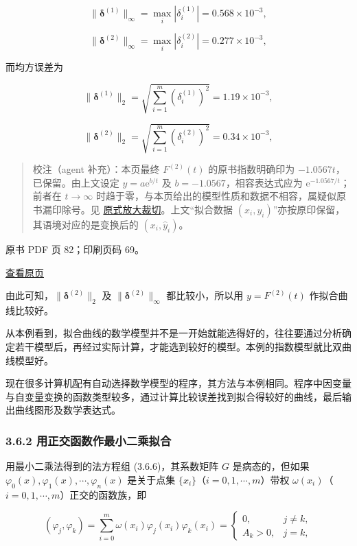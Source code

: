 \[
\|\boldsymbol\delta^{(1)}\|_\infty=\max_i|\delta_i^{(1)}|=0.568\times10^{-3},
\]

\[
\|\boldsymbol\delta^{(2)}\|_\infty=\max_i|\delta_i^{(2)}|=0.277\times10^{-3},
\]

而均方误差为

\[
\|\boldsymbol\delta^{(1)}\|_2=\sqrt{\sum_{i=1}^m(\delta_i^{(1)})^2}=1.19\times10^{-3},
\]

\[
\|\boldsymbol\delta^{(2)}\|_2=\sqrt{\sum_{i=1}^m(\delta_i^{(2)})^2}=0.34\times10^{-3},
\]

\begin{quote}
校注（agent 补充）：本页最终 \(F^{(2)}(t)\) 的原书指数明确印为 \(-1.0567t\)，已保留。由上文设定 \(y=a\mathrm e^{b/t}\) 及 \(b=-1.0567\)，相容表达式应为 \(\mathrm e^{-1.0567/t}\)；前者在 \(t\to\infty\) 时趋于零，与本页给出的模型性质和数据不相容，属疑似原书漏印除号。见 \href{verified/assets/ch03b/p081-exponential-fit.png}{原式放大裁切}。上文``拟合数据 \((x_i,y_i)\)''亦按原印保留，其语境对应的是变换后的 \((x_i,\hat y_i)\)。
\end{quote}

\clearpage

原书 PDF 页 82；印刷页码 69。

\href{source-images/pdf-082.jpeg}{查看原页}

由此可知，\(\|\boldsymbol\delta^{(2)}\|_2\) 及 \(\|\boldsymbol\delta^{(2)}\|_\infty\) 都比较小，所以用 \(y=F^{(2)}(t)\) 作拟合曲线比较好。

从本例看到，拟合曲线的数学模型并不是一开始就能选得好的，往往要通过分析确定若干模型后，再经过实际计算，才能选到较好的模型。本例的指数模型就比双曲线模型好。

现在很多计算机配有自动选择数学模型的程序，其方法与本例相同。程序中因变量与自变量变换的函数类型较多，通过计算比较误差找到拟合得较好的曲线，最后输出曲线图形及数学表达式。

\subsubsection{3.6.2 用正交函数作最小二乘拟合}\label{ch03b-ux7528ux6b63ux4ea4ux51fdux6570ux4f5cux6700ux5c0fux4e8cux4e58ux62dfux5408}

用最小二乘法得到的法方程组 (3.6.6)，其系数矩阵 \(G\) 是病态的，但如果 \(\varphi_0(x),\varphi_1(x),\cdots,\varphi_n(x)\) 是关于点集 \(\{x_i\}\)（\(i=0,1,\cdots,m\)）带权 \(\omega(x_i)\)（\(i=0,1,\cdots,m\)）正交的函数族，即

\[
(\varphi_j,\varphi_k)=\sum_{i=0}^m\omega(x_i)\varphi_j(x_i)\varphi_k(x_i)=\begin{cases}0,&j\ne k,\\ A_k>0,&j=k,\end{cases}\tag{3.6.8}
\]

